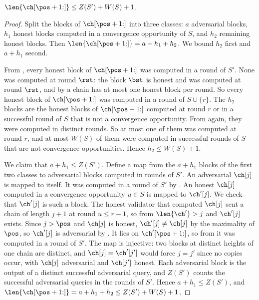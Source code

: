 \begin{lemma}\label{lem.count}
    $\len{\ch[\pos+1{:}]}\le Z(S')+W(S)+1$.
\end{lemma}
\begin{proof}
    Split the blocks of $\ch[\pos+1{:}]$ into three classes: $a$ adversarial
    blocks, $h_1$ honest blocks computed in a convergence opportunity of $S$,
    and $h_2$ remaining honest blocks. Then $\len{\ch[\pos+1{:}]}=a+h_1+h_2$.
    We bound $h_2$ first and $a+h_1$ second.

    From , every honest block of $\ch[\pos+1{:}]$ was
    computed in a round of $S'$. None was computed at round $\rst$: the block
    $\bst$ is honest and was computed at round $\rst$, and by
     a chain has at most one honest block per round. So
    every honest block of $\ch[\pos+1{:}]$ was computed in a round of
    $S\cup\{r\}$. The $h_2$ blocks are the honest blocks of $\ch[\pos+1{:}]$
    computed at round $r$ or in a successful round of $S$ that is not a
    convergence opportunity. From  again, they were
    computed in distinct rounds. So at most one of them was computed at round
    $r$, and at most $W(S)$ of them were computed in successful rounds of $S$
    that are not convergence opportunities. Hence
    $h_2\le W(S)+1$.

    We claim that $a+h_1\le Z(S')$. Define a map from the $a+h_1$ blocks of the
    first two classes to adversarial blocks computed in rounds of $S'$. An
    adversarial $\ch[j]$ is mapped to itself. It was computed in a round of $S'$
    by . An honest $\ch[j]$ computed in a convergence
    opportunity $u\in S$ is mapped to $\ch'[j]$. We check that $\ch'[j]$ is such
    a block. The honest validator that computed $\ch[j]$ sent a chain of length
    $j+1$ at round $u\le r-1$, so from  $\len{\ch'}>j$ and
    $\ch'[j]$ exists. Since $j>\pos$ and $\ch[j]$ is honest, $\ch'[j]\ne\ch[j]$
    by the maximality of $\pos$, so $\ch'[j]$ is adversarial by
    . It lies on $\ch'[\pos+1{:}]$, so from 
    it was computed in a round of $S'$. The map is injective: two blocks at
    distinct heights of one chain are distinct, and $\ch[j]=\ch'[j']$ would
    force $j=j'$ since no copies occur, with $\ch[j]$ adversarial and $\ch[j']$
    honest. Each adversarial block is the output of a distinct successful
    adversarial query, and $Z(S')$ counts the successful adversarial queries in
    the rounds of $S'$. Hence $a+h_1\le Z(S')$, and
    $\len{\ch[\pos+1{:}]}=a+h_1+h_2\le Z(S')+W(S)+1$.
\end{proof}

